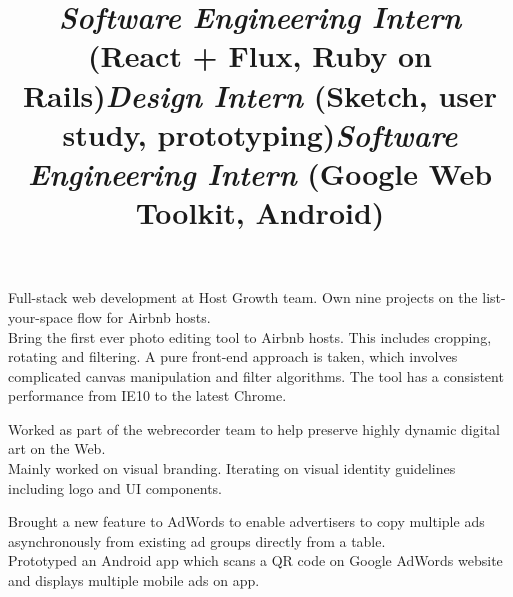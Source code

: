 \begin{resume}
\title{\textsl{Software Engineering Intern} (React + Flux, Ruby on Rails)}
\begin{position}
Full-stack web development at Host Growth team. Own nine projects on the list-your-space flow for Airbnb hosts. \\
Bring the first ever photo editing tool to Airbnb hosts. This includes cropping, rotating and filtering. A pure front-end approach is taken, which involves complicated canvas manipulation and filter algorithms. The tool has a consistent performance from IE10 to the latest Chrome.
\end{position}

\title{\textsl{Design Intern} (Sketch, user study, prototyping)}
\begin{position}
Worked as part of the webrecorder team to help preserve highly dynamic digital art on the Web. \\
Mainly worked on visual branding. Iterating on visual identity guidelines including logo and UI components.
\end{position}

\title{\textsl{Software Engineering Intern} (Google Web Toolkit, Android)}
\begin{position}
Brought a new feature to AdWords to enable advertisers to copy multiple ads asynchronously from existing ad groups directly from a table. \\
Prototyped an Android app which scans a QR code on Google AdWords website and displays multiple mobile ads on app.

\end{position}




\begin{formatb}
  \\
  \body\\
\end{formatb}


\end{resume}
